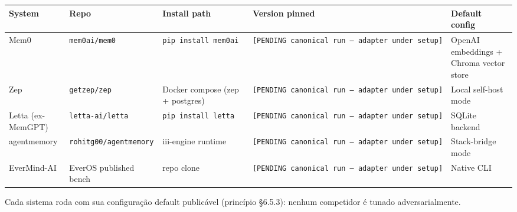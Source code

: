 \documentclass[
]{article}
\newcounter{none} %
\begin{document}
{\def\LTcaptype{none} %
\begin{longtable}[]{@{}
  >{\raggedright\arraybackslash}p{}
  >{\raggedright\arraybackslash}p{}
  >{\raggedright\arraybackslash}p{}
  >{\raggedright\arraybackslash}p{}
  >{\raggedright\arraybackslash}p{}@{}}
\toprule\noalign{}
\begin{minipage}[b]{\linewidth}\raggedright
System
\end{minipage} & \begin{minipage}[b]{\linewidth}\raggedright
Repo
\end{minipage} & \begin{minipage}[b]{\linewidth}\raggedright
Install path
\end{minipage} & \begin{minipage}[b]{\linewidth}\raggedright
Version pinned
\end{minipage} & \begin{minipage}[b]{\linewidth}\raggedright
Default config
\end{minipage} \\
\midrule\noalign{}
\endhead
\bottomrule\noalign{}
\endlastfoot
Mem0 & \texttt{mem0ai/mem0} & \texttt{pip\ install\ mem0ai} &
\texttt{{[}PENDING\ canonical\ run\ —\ adapter\ under\ setup{]}} &
OpenAI embeddings + Chroma vector store \\
Zep & \texttt{getzep/zep} & Docker compose (zep + postgres) &
\texttt{{[}PENDING\ canonical\ run\ —\ adapter\ under\ setup{]}} & Local
self-host mode \\
Letta (ex-MemGPT) & \texttt{letta-ai/letta} &
\texttt{pip\ install\ letta} &
\texttt{{[}PENDING\ canonical\ run\ —\ adapter\ under\ setup{]}} &
SQLite backend \\
agentmemory & \texttt{rohitg00/agentmemory} & iii-engine runtime &
\texttt{{[}PENDING\ canonical\ run\ —\ adapter\ under\ setup{]}} &
Stack-bridge mode \\
EverMind-AI & EverOS published bench & repo clone &
\texttt{{[}PENDING\ canonical\ run\ —\ adapter\ under\ setup{]}} &
Native CLI \\
\end{longtable}
}

Cada sistema roda com sua configuração default publicável (princípio
§6.5.3): nenhum competidor é tunado adversarialmente.
\end{document}
